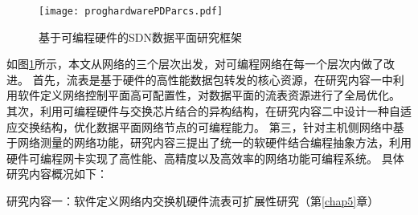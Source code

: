\begin{figure}[!ht]
	\centering 
	\vspace{-1.5mm} 
	\texttt{[image: proghardwarePDParcs.pdf]}
	\caption{基于可编程硬件的SDN数据平面研究框架} \label{fig:proghardwarePDParcs}
\end{figure}

如图\ref{fig:proghardwarePDParcs}所示，本文从网络的三个层次出发，对可编程网络在每一个层次内做了改进。
首先，流表是基于硬件的高性能数据包转发的核心资源，在研究内容一中利用软件定义网络控制平面高可配置性，对数据平面的流表资源进行了全局优化。
其次，利用可编程硬件与交换芯片结合的异构结构，在研究内容二中设计一种自适应交换结构，优化数据平面网络节点的可编程能力。
第三，针对主机侧网络中基于网络测量的网络功能，研究内容三提出了统一的软硬件结合编程抽象方法，利用硬件可编程网卡实现了高性能、高精度以及高效率的网络功能可编程系统。
%
%
%
具体研究内容概况如下：

{\hei 研究内容一：软件定义网络内交换机硬件流表可扩展性研究（第\ref{chap5}章）}

